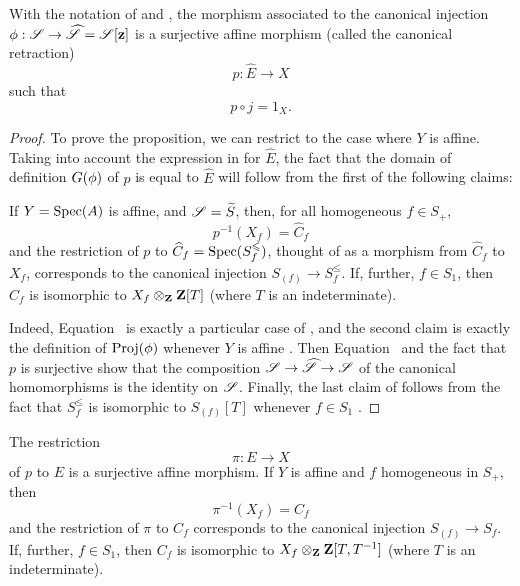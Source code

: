 \begin{proposition}[8.3.5]
\label{II.8.3.5}
With the notation of  and , the morphism associated  to the canonical injection $\vphi:\sh{S} \to \widehat{\sh{S}} = \sh{S}[\bb{z}]$ is a surjective affine morphism (called the canonical retraction)
\[
\label{II.8.3.5.1}
  p:\widehat{E} \to X
\tag{8.3.5.1}
\]
such that
\[
\label{II.8.3.5.2}
  p \circ j = 1_X.
\tag{8.3.5.2}
\]
\end{proposition}

\begin{proof}
To prove the proposition, we can restrict to the case where $Y$ is affine.
Taking into account the expression in  for $\widehat{E}$, the fact that the domain of definition $G(\phi)$ of $p$ is equal to $\widehat{E}$ will follow from the first of the following claims:
\begin{env}[8.3.5.3]
\label{II.8.3.5.3}
If $Y=\operatorname{Spec}(A)$ is affine, and $\mathscr{S}=\widetilde{S}$, then, for all homogeneous $f\in S_+$,
\[
\label{II.8.3.5.4}
  p^{-1}(X_f) = \widehat{C}_f
\tag{8.3.5.4}
\]
and the restriction of $p$ to $\widehat{C}_f=\operatorname{Spec}(S_f^\leqslant)$, thought of as a morphism from $\widehat{C}_f$ to $X_f$, corresponds to the canonical injection $S_{(f)}\to S_f^\leq$.
If, further, $f\in S_1$, then $\widehat{C}_f$ is isomorphic to $X_f\otimes_{\mathbf{Z}}\mathbf{Z}[T]$ (where $T$ is an indeterminate).
\end{env}

Indeed, Equation~ is exactly a particular case of , and the second claim is exactly the definition of $\operatorname{Proj}(\phi)$ whenever $Y$ is affine .
Then Equation~ and the fact that $p$ is surjective show that the composition $\sh{S}\to\widehat{\sh{S}}\to\sh{S}$ of the canonical homomorphisms is the identity on $\mathscr{S}$.
Finally, the last claim of  follows from the fact that $S_f^\leq$ is isomorphic to $S_{(f)}[T]$ whenever $f\in S_1$ .
\end{proof}

\begin{corollary}[8.3.6]
\label{II.8.3.6}
The restriction
\[
\label{II.8.3.6.1}
  \pi: E \to X
\tag{8.3.6.1}
\]
of $p$ to $E$ is a surjective affine morphism.
If $Y$ is affine and $f$ homogeneous in $S_+$, then
\[
\label{II.8.3.6.2}
  \pi^{-1}(X_f) = C_f
\tag{8.3.6.2}
\]
and the restriction of $\pi$ to $C_f$ corresponds to the canonical injection $S_{(f)}\to S_f$.
If, further, $f\in S_1$, then $C_f$ is isomorphic to $X_f\otimes_{\mathbf{Z}}\mathbf{Z}[T,T^{-1}]$ (where $T$ is an indeterminate).
\end{corollary}

